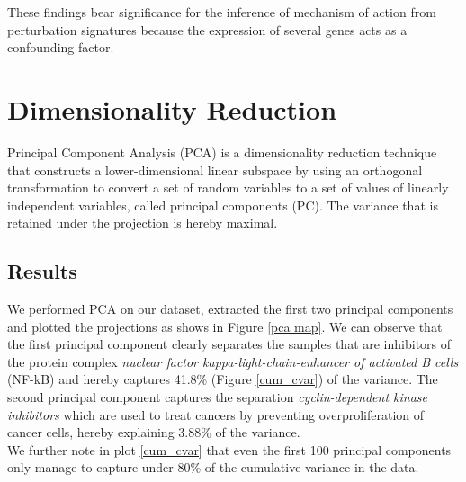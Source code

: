 \documentclass[bsc,frontabs,twoside,singlespacing,parskip,deptreport]{infthesis}     %
\let\Oldsection\section
\renewcommand{\section}{\FloatBarrier\Oldsection}
\let\Oldsubsection\subsection
\renewcommand{\subsection}{\FloatBarrier\Oldsubsection}
\begin{document}
These findings bear significance for the inference of mechanism of action from perturbation signatures because the expression of several genes acts as a confounding factor.


\section{Dimensionality Reduction}
Principal Component Analysis (PCA) is a dimensionality reduction technique that constructs a lower-dimensional linear subspace by using an orthogonal transformation to convert a set of random variables to a set of values of linearly independent variables, called principal components (PC). The variance that is retained under the projection is hereby maximal.\\
\subsection{Results}
We performed PCA on our dataset, extracted the first two principal components and plotted the projections as shows in Figure \ref{pca map}. We can observe that the first principal component clearly separates the samples that are inhibitors of the protein complex \textit{nuclear factor kappa-light-chain-enhancer of activated B cells} (NF-kB) and hereby captures 41.8\% (Figure \ref{cum_cvar}) of the variance. The second principal component captures the separation \textit{cyclin-dependent kinase inhibitors} which are used to treat cancers by preventing overproliferation of cancer cells, hereby explaining 3.88\% of the variance.\\
We further note in plot \ref{cum_cvar} that even the first 100 principal components only manage to capture under 80\% of the cumulative variance in the data.
\end{document}
